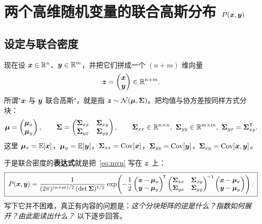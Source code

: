\section{两个高维随机变量的联合高斯分布 \texorpdfstring{$P(\bm{x},\bm{y})$}{P(x,y)}}\label{sec:joint}

\subsection{设定与联合密度}

现在设 $\bm{x}\in\mathbb{R}^n$、$\bm{y}\in\mathbb{R}^m$，并把它们拼成一个 $(n+m)$ 维向量
\[
\bm{z}=\begin{pmatrix}\bm{x}\\ \bm{y}\end{pmatrix}\in\mathbb{R}^{n+m}.
\]
所谓"$\bm{x}$ 与 $\bm{y}$ 联合高斯"，就是指 $\bm{z}\sim\mathcal{N}(\bm{\mu},\bm{\Sigma})$。把均值与协方差按同样方式分块：
\begin{equation}\label{eq:partition}
\vmu=\begin{pmatrix}\vmu_x\\ \vmu_y\end{pmatrix},\qquad
\mSigma=\begin{pmatrix}\mSigma_{xx}&\mSigma_{xy}\\ \mSigma_{yx}&\mSigma_{yy}\end{pmatrix},\qquad
\mSigma_{xx}\in\R^{n\times n},\ \mSigma_{yy}\in\R^{m\times m},\ \mSigma_{yx}=\mSigma_{xy}^\T .
\end{equation}
这里 $\bm{\mu}_x=\mathbb{E}[\bm{x}]$，$\bm{\mu}_y=\mathbb{E}[\bm{y}]$，$\bm{\Sigma}_{xx}=\operatorname{Cov}[\bm{x}]$，$\bm{\Sigma}_{yy}=\operatorname{Cov}[\bm{y}]$，$\bm{\Sigma}_{xy}=\operatorname{Cov}[\bm{x},\bm{y}]$。

于是联合密度的\textbf{表达式}就是把~\eqref{eq:mvn} 写在 $\bm{z}$ 上：
\begin{equation}\label{eq:joint}
\boxed{\;
P(\bm{x},\bm{y})=\frac{1}{(2\pi)^{(n+m)/2}\,(\det\bm{\Sigma})^{1/2}}
\exp\!\left(-\frac12
\begin{pmatrix}\bm{x}-\bm{\mu}_x\\ \bm{y}-\bm{\mu}_y\end{pmatrix}^{\!\mathsf{T}}
\begin{pmatrix}\bm{\Sigma}_{xx}&\bm{\Sigma}_{xy}\\ \bm{\Sigma}_{yx}&\bm{\Sigma}_{yy}\end{pmatrix}^{\!-1}
\begin{pmatrix}\bm{x}-\bm{\mu}_x\\ \bm{y}-\bm{\mu}_y\end{pmatrix}
\right).\;}
\end{equation}
写下它并不困难，真正有内容的问题是：\emph{这个分块矩阵的逆是什么？指数如何展开？由此能读出什么？} 以下逐步回答。

